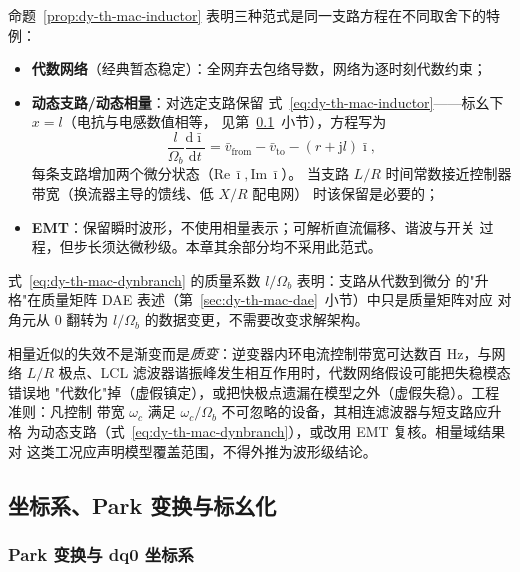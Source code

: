 \begin{remark}[三种建模范式的统一视角]\label{rem:dy-th-mac-threeregimes}
命题~\ref{prop:dy-th-mac-inductor} 表明三种范式是同一支路方程在不同取舍下的特例：
\begin{itemize}
  \item \textbf{代数网络}（经典暂态稳定）：全网弃去包络导数，网络为逐时刻代数约束；
  \item \textbf{动态支路/动态相量}：对选定支路保留
        式~\eqref{eq:dy-th-mac-inductor}——标幺下 $x=l$（电抗与电感数值相等，
        见第~\ref{sec:dy-th-mac-park}~小节），方程写为
        \begin{equation}
        \frac{l}{\Omega_b}\frac{\mathrm d\bar\imath}{\mathrm dt}
        =\bar v_{\mathrm{from}}-\bar v_{\mathrm{to}}-(r+\mathrm jl)\bar\imath ,
        \label{eq:dy-th-mac-dynbranch}
        \end{equation}
        每条支路增加两个微分状态（$\mathrm{Re}\,\bar\imath,\mathrm{Im}\,\bar\imath$）。
        当支路 $L/R$ 时间常数接近控制器带宽（换流器主导的馈线、低 $X/R$ 配电网）
        时该保留是必要的；
  \item \textbf{EMT}：保留瞬时波形，不使用相量表示；可解析直流偏移、谐波与开关
        过程，但步长须达微秒级。本章其余部分均不采用此范式。
\end{itemize}
式~\eqref{eq:dy-th-mac-dynbranch} 的质量系数 $l/\Omega_b$ 表明：支路从代数到微分
的"升格"在质量矩阵 DAE 表述（第~\ref{sec:dy-th-mac-dae}~小节）中只是质量矩阵对应
对角元从 $0$ 翻转为 $l/\Omega_b$ 的数据变更，不需要改变求解架构。
\end{remark}

\begin{remark}\label{rem:dy-th-mac-ibr}
相量近似的失效不是渐变而是\emph{质变}：逆变器内环电流控制带宽可达数百 Hz，与网络
$L/R$ 极点、LCL 滤波器谐振峰发生相互作用时，代数网络假设可能把失稳模态错误地
"代数化"掉（虚假镇定），或把快极点遗漏在模型之外（虚假失稳）。工程准则：凡控制
带宽 $\omega_c$ 满足 $\omega_c/\Omega_b$ 不可忽略的设备，其相连滤波器与短支路应升格
为动态支路（式~\eqref{eq:dy-th-mac-dynbranch}），或改用 EMT 复核。相量域结果对
这类工况应声明模型覆盖范围，不得外推为波形级结论。
\end{remark}

\subsection{坐标系、Park 变换与标幺化}\label{sec:dy-th-mac-park}

\subsubsection{Park 变换与 dq0 坐标系}

